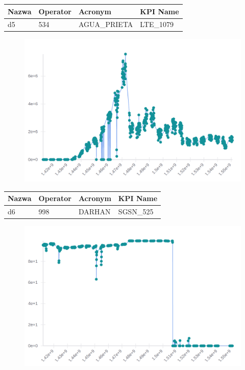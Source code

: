 \documentclass[eng,printmode]{mgr}
\begin{document}
\begingroup
\fontsize{10pt}{12pt}\selectfont
\begin{tabu} to 0.9\textwidth { | X[l] | X[l] | X[l] | X[l] |}
\hline
\textbf{Nazwa} & \textbf{Operator} & \textbf{Acronym} & \textbf{KPI Name} \\
\hline
d5 & 534 & AGUA\_PRIETA & LTE\_1079 \\
\hline
\end{tabu}
\endgroup

\begin{figure}[H]
  \begin{center}
  \includegraphics[scale=0.4]{d5}
  \end{center}
\end{figure}
\newpage

\begingroup
\fontsize{10pt}{12pt}\selectfont
\begin{tabu} to 0.9\textwidth { | X[l] | X[l] | X[l] | X[l] |}
\hline
\textbf{Nazwa} & \textbf{Operator} & \textbf{Acronym} & \textbf{KPI Name} \\
\hline
d6 & 998 & DARHAN & SGSN\_525 \\
\hline
\end{tabu}
\endgroup

\begin{figure}[H]
  \begin{center}
  \includegraphics[scale=0.53]{d6}
  \end{center}
\end{figure}
\newpage
\end{document}

